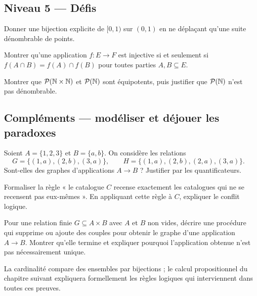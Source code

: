 \subsection*{Niveau 5 — Défis}
\begin{exercice}\label{ex:ens:16}Donner une bijection explicite de $[0,1)$ sur $(0,1)$ en ne déplaçant qu'une suite dénombrable de points.\end{exercice}
\begin{exercice}\label{ex:ens:17}Montrer qu'une application $f:E\to F$ est injective si et seulement si $f(A\cap B)=f(A)\cap f(B)$ pour toutes parties $A,B\subseteq E$.\end{exercice}
\begin{exercice}\label{ex:ens:18}Montrer que $\mathcal P(\mathbb N\times\mathbb N)$ et $\mathcal P(\mathbb N)$ sont équipotents, puis justifier que $\mathcal P(\mathbb N)$ n'est pas dénombrable.\end{exercice}


\subsection*{Compléments — modéliser et déjouer les paradoxes}
\begin{exercice}\label{ex:ens:19}
Soient $A=\{1,2,3\}$ et $B=\{a,b\}$. On considère les relations
\[
 G=\{(1,a),(2,b),(3,a)\},\qquad
 H=\{(1,a),(2,b),(2,a),(3,a)\}.
\]
Sont-elles des graphes d'applications $A\to B$ ? Justifier par les quantificateurs.
\end{exercice}
\begin{exercice}[Le bibliothécaire]\label{ex:ens:20}
Formaliser la règle « le catalogue $C$ recense exactement les catalogues qui ne se recensent pas eux-mêmes ».
En appliquant cette règle à $C$, expliquer le conflit logique.
\end{exercice}
\begin{exercice}\label{ex:ens:21}
Pour une relation finie $G\subseteq A\times B$ avec $A$ et $B$ non vides, décrire
une procédure qui supprime ou ajoute des couples pour obtenir le graphe d'une application $A\to B$.
Montrer qu'elle termine et expliquer pourquoi l'application obtenue n'est pas nécessairement unique.
\end{exercice}


\begin{retenir}La cardinalité compare des ensembles par bijections ; le calcul propositionnel du chapitre suivant expliquera formellement les règles logiques qui interviennent dans toutes ces preuves.\end{retenir}

